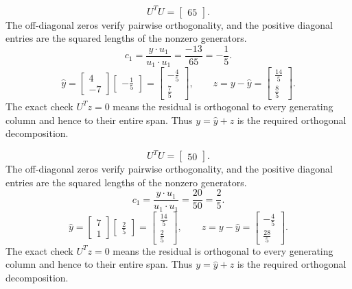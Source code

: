 \[U^TU=\left[\begin{array}{r}65\end{array}\right].\]
The off-diagonal zeros verify pairwise orthogonality, and the positive diagonal entries are the squared lengths of the nonzero generators.
\[c_{1}=\frac{y\cdot u_{1}}{u_{1}\cdot u_{1}}=\frac{-13}{65}=- \frac{1}{5}.\]
\[\widehat y=\left[\begin{array}{r}4\\-7\end{array}\right]\left[\begin{array}{r}- \frac{1}{5}\end{array}\right]=\left[\begin{array}{r}- \frac{4}{5}\\\frac{7}{5}\end{array}\right],\qquad z=y-\widehat y=\left[\begin{array}{r}\frac{14}{5}\\\frac{8}{5}\end{array}\right].\]
The exact check $U^Tz=0$ means the residual is orthogonal to every generating column and hence to their entire span. Thus $y=\widehat y+z$ is the required orthogonal decomposition.


\[U^TU=\left[\begin{array}{r}50\end{array}\right].\]
The off-diagonal zeros verify pairwise orthogonality, and the positive diagonal entries are the squared lengths of the nonzero generators.
\[c_{1}=\frac{y\cdot u_{1}}{u_{1}\cdot u_{1}}=\frac{20}{50}=\frac{2}{5}.\]
\[\widehat y=\left[\begin{array}{r}7\\1\end{array}\right]\left[\begin{array}{r}\frac{2}{5}\end{array}\right]=\left[\begin{array}{r}\frac{14}{5}\\\frac{2}{5}\end{array}\right],\qquad z=y-\widehat y=\left[\begin{array}{r}- \frac{4}{5}\\\frac{28}{5}\end{array}\right].\]
The exact check $U^Tz=0$ means the residual is orthogonal to every generating column and hence to their entire span. Thus $y=\widehat y+z$ is the required orthogonal decomposition.


